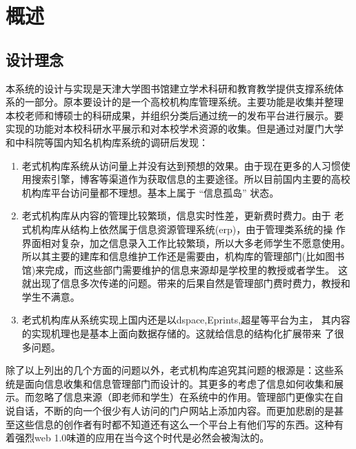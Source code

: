 
\chapter{概述}
\label{chap:intro}

\section{设计理念}
\label{sec:dongji}

本系统的设计与实现是天津大学图书馆建立学术科研和教育教学提供支撑系统体
系的一部分。原本要设计的是一个高校机构库管理系统。主要功能是收集并整理
本校老师和博硕士的科研成果，并组织分类后通过统一的发布平台进行展示。要
实现的功能对本校科研水平展示和对本校学术资源的收集。但是通过对厦门大学
和中科院等国内知名机构库系统的调研后发现：
\begin{enumerate}
\item 老式机构库系统从访问量上并没有达到预想的效果。由于现在更多的人习惯使
  用搜索引擎，博客等渠道作为获取信息的主要途径。所以目前国内主要的高校
  机构库平台访问量都不理想。基本上属于 “信息孤岛” 状态。
\item 老式机构库从内容的管理比较繁琐，信息实时性差，更新费时费力。由于
  老式机构库从结构上依然属于信息资源管理系统(erp)，由于管理类系统的操
  作界面相对复杂，加之信息录入工作比较繁琐，所以大多老师学生不愿意使用。
  所以其主要的建库和信息维护工作还是需要由，机构库的管理部门(比如图书
  馆)来完成，而这些部门需要维护的信息来源却是学校里的教授或者学生。
  这就出现了信息多次传递的问题。带来的后果自然是管理部门费时费力，教授和学生不满意。
\item 老式机构库从系统实现上国内还是以dspace,Eprints,超星等平台为主，
  其内容的实现机理也是基本上面向数据存储的。这就给信息的结构化扩展带来
  了很多问题。
\end{enumerate}
除了以上列出的几个方面的问题以外，老式机构库追究其问题的根源是：这些系
统是面向信息收集和信息管理部门而设计的。其更多的考虑了信息如何收集和展
示。而忽略了信息来源（即老师和学生）在系统中的作用。管理部门更像实在自
说自话，不断的向一个很少有人访问的门户网站上添加内容。而更加悲剧的是甚
至这些信息的创作者有时都不知道还有这么一个平台上有他们写的东西。这种有
着强烈web 1.0味道的应用在当今这个时代是必然会被淘汰的。

